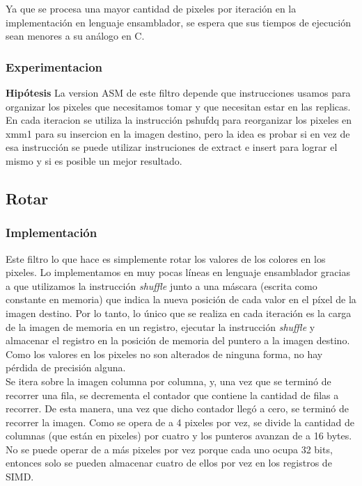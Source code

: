 \documentclass[a4paper]{article}
\begin{document}
Ya que se procesa una mayor cantidad de pixeles por iteración en la implementación en lenguaje ensamblador, se espera que sus tiempos de ejecución sean menores a su análogo en C.


\subsubsection{Experimentacion}
\textbf{Hipótesis}
\newline
La version ASM de este filtro depende que instrucciones usamos para organizar los pixeles que necesitamos tomar  y que necesitan estar en las replicas. En cada iteracion se utiliza la instrucción pshufdq para reorganizar los pixeles en xmm1 para su insercion en la imagen destino, pero la idea es probar si en vez de esa instrucción se puede utilizar instruciones de extract e insert para lograr el mismo y si es posible un mejor resultado.

\newpage
\subsection{Rotar}
\subsubsection{Implementación}
Este filtro lo que hace es simplemente rotar los valores de los colores en los pixeles. Lo implementamos en muy pocas líneas en lenguaje ensamblador gracias a que utilizamos la instrucción \textit{shuffle} junto a una máscara (escrita como constante en memoria) que indica la nueva posición de cada valor en el píxel de la imagen destino. Por lo tanto, lo único que se realiza en cada iteración es la carga de la imagen de memoria en un registro, ejecutar la instrucción \textit{shuffle} y almacenar el registro en la posición de memoria del puntero a la imagen destino. 
\\Como los valores en los pixeles no son alterados de ninguna forma, no hay pérdida de precisión alguna.\\

Se itera sobre la imagen columna por columna, y, una vez que se terminó de recorrer una fila, se decrementa el contador que contiene la cantidad de filas a recorrer. De esta manera, una vez que dicho contador llegó a cero, se terminó de recorrer la imagen. Como se opera de a 4 pixeles por vez, se divide la cantidad de columnas (que están en pixeles) por cuatro y los punteros avanzan de a 16 bytes. No se puede operar de a más pixeles por vez porque cada uno ocupa 32 bits, entonces solo se pueden almacenar cuatro de ellos por vez en los registros de SIMD.\\
\end{document}
